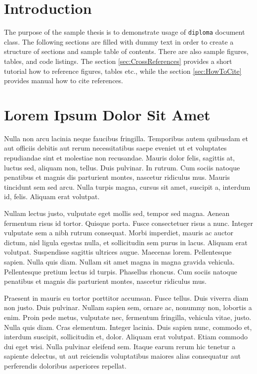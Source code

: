 \documentclass[english,master,dept460,male,cpp,cpdeclaration]{diploma}
\begin{document}
\MakeTitlePages

\section{Introduction}
\label{sec:Introduction}
The purpose of the sample thesis is to demonstrate usage of \verb|diploma| document class. The following sections are filled with dummy text in order to create a structure of sections and sample table of contents. There are also sample figures, tables, and code listings. The section \ref{sec:CrossReferences} provides a short tutorial how to reference figures, tables etc., while the section \ref{sec:HowToCite} provides manual how to cite references.


\section{Lorem Ipsum Dolor Sit Amet}
Nulla non arcu lacinia neque faucibus fringilla. Temporibus autem quibusdam et aut officiis debitis aut rerum necessitatibus saepe eveniet ut et voluptates repudiandae sint et molestiae non recusandae. Mauris dolor felis, sagittis at, luctus sed, aliquam non, tellus. Duis pulvinar. In rutrum. Cum sociis natoque penatibus et magnis dis parturient montes, nascetur ridiculus mus. Mauris tincidunt sem sed arcu. Nulla turpis magna, cursus sit amet, suscipit a, interdum id, felis. Aliquam erat volutpat.

Nullam lectus justo, vulputate eget mollis sed, tempor sed magna. Aenean fermentum risus id tortor. Quisque porta. Fusce consectetuer risus a nunc. Integer vulputate sem a nibh rutrum consequat. Morbi imperdiet, mauris ac auctor dictum, nisl ligula egestas nulla, et sollicitudin sem purus in lacus. Aliquam erat volutpat. Suspendisse sagittis ultrices augue. Maecenas lorem. Pellentesque sapien. Nulla quis diam. Nullam sit amet magna in magna gravida vehicula. Pellentesque pretium lectus id turpis. Phasellus rhoncus. Cum sociis natoque penatibus et magnis dis parturient montes, nascetur ridiculus mus.

Praesent in mauris eu tortor porttitor accumsan. Fusce tellus. Duis viverra diam non justo. Duis pulvinar. Nullam sapien sem, ornare ac, nonummy non, lobortis a enim. Proin pede metus, vulputate nec, fermentum fringilla, vehicula vitae, justo. Nulla quis diam. Cras elementum. Integer lacinia. Duis sapien nunc, commodo et, interdum suscipit, sollicitudin et, dolor. Aliquam erat volutpat. Etiam commodo dui eget wisi. Nulla pulvinar eleifend sem. Itaque earum rerum hic tenetur a sapiente delectus, ut aut reiciendis voluptatibus maiores alias consequatur aut perferendis doloribus asperiores repellat.
\end{document}
